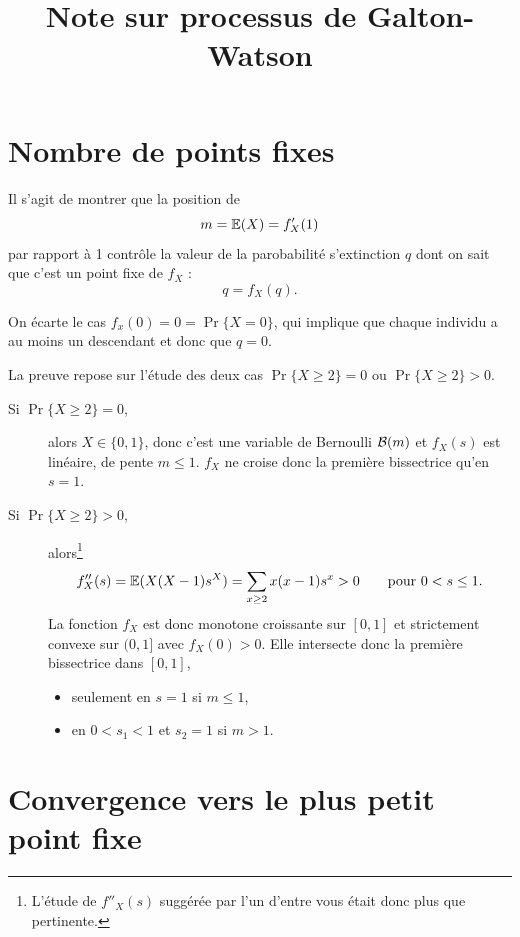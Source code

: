 \documentclass[french, 12pt]{article}
\title{Note sur processus de Galton-Watson}
\numberwithin{exercise}{section}
\numberwithin{equation}{section}
\begin{document}


\section*{Nombre de points fixes}
Il s'agit de montrer que la position de
$$
m = \operatorname{\mathbb{E}}(X) = f'_X(1)
$$
par rapport à 1 contrôle la valeur de la parobabilité s'extinction $q$ dont on sait que c'est un point fixe de $f_X$ : 
$$
q = f_X(q).
$$

\bigskip
On écarte le cas $f_x(0) = 0 = \Pr\{X = 0\}$, qui implique que chaque individu a au moins un descendant et donc que $q = 0$.

\bigskip
La preuve repose sur l'étude des deux cas $\Pr\{X\geq 2\} = 0$ ou $\Pr\{X\geq 2\} > 0$. 

\begin{description}
  \item[Si $\Pr\{X\geq 2\} = 0$,] alors $X \in \{0, 1\}$, donc c'est une variable de Bernoulli $\mathcal{B}(m)$ et $f_X(s)$ est linéaire, de pente $m \leq 1$. $f_X$ ne croise donc la première bissectrice qu'en $s = 1$.
  \item[Si $\Pr\{X\geq 2\} > 0$,] alors\footnote{L'étude de $f''_X(s)$ suggérée par l'un d'entre vous était donc plus que pertinente.}
  $$
  f''_X(s) = \operatorname{\mathbb{E}}(X(X-1) s^X) = \sum_{x \geq 2} x (x-1) s^x > 0
  \qquad \text{pour } 0 < s \leq 1.
  $$
  La fonction $f_X$ est donc monotone croissante sur $[0, 1]$ et strictement convexe sur $(0, 1]$ avec $f_X(0) > 0$. Elle intersecte donc la première bissectrice dans $[0, 1]$, 
  \begin{itemize}
   \item seulement en $s=1$ si $m \leq 1$, 
   \item en $0 < s_1 < 1$ et $s_2=1$ si $m > 1$. 
  \end{itemize}
\end{description}

\section*{Convergence vers le plus petit point fixe}
\end{document}

